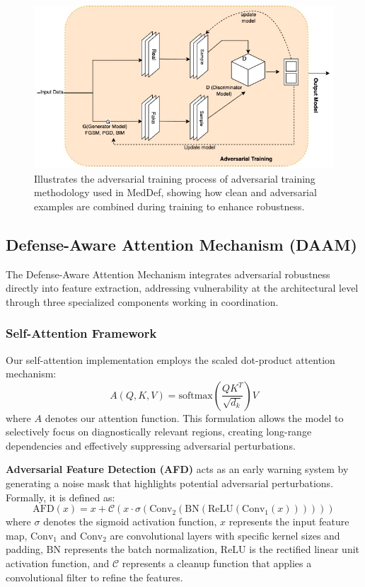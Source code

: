 \documentclass[preprint,12pt]{elsarticle}
\begin{document}
\begin{figure}[!t]
\centerline{\includegraphics[width=\columnwidth]{fig/fig3.jpg}}
\caption{Illustrates the adversarial training process of adversarial training methodology used in MedDef, showing how clean and adversarial examples are combined during training to enhance robustness.}
\label{fig:adversarial_training}
\end{figure}

\subsection{Defense-Aware Attention Mechanism (DAAM)}
The Defense-Aware Attention Mechanism integrates adversarial robustness directly into feature extraction, addressing vulnerability at the architectural level through three specialized components working in coordination.

\subsubsection{Self-Attention Framework}
Our self-attention implementation employs the scaled dot-product attention mechanism:
\begin{equation}
A(Q, K, V) = \text{softmax}\left(\frac{QK^T}{\sqrt{d_k}}\right)V
\end{equation}
where $A$ denotes our attention function. This formulation allows the model to selectively focus on diagnostically relevant regions, creating long-range dependencies and effectively suppressing adversarial perturbations.

\textbf{Adversarial Feature Detection (AFD)} acts as an early warning system by generating a noise mask that highlights potential adversarial perturbations\cite{Rossolini24}. Formally, it is defined as:
\begin{equation}
\text{AFD}(x) = x + \mathcal{C}(x \cdot \sigma(\text{Conv}_2(\text{BN}(\text{ReLU}(\text{Conv}_1(x))))))
\end{equation}
where $\sigma$ denotes the sigmoid activation function, $x$ represents the input feature map, $\text{Conv}_1$ and $\text{Conv}_2$ are convolutional layers with specific kernel sizes and padding, $\text{BN}$ represents the batch normalization, $\text{ReLU}$ is the rectified linear unit activation function, and $\mathcal{C}$ represents a cleanup function that applies a convolutional filter to refine the features.
\end{document}
